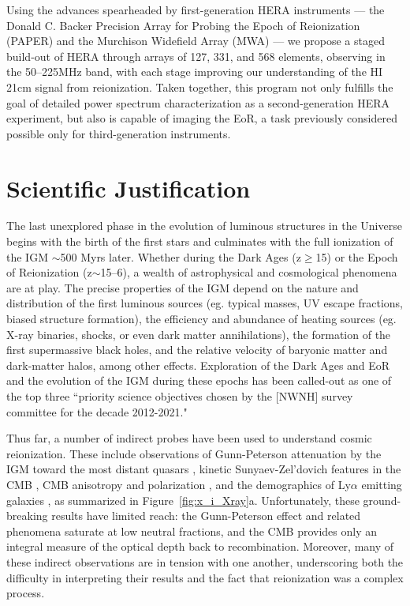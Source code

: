 \documentclass[preprint]{aastex}
\begin{document}
Using the advances spearheaded by 
first-generation HERA instruments --- the Donald C. Backer Precision
Array for Probing the Epoch of Reionization (PAPER) and the Murchison Widefield Array (MWA) ---
we propose a staged
build-out of HERA
through arrays of 127, 331, and 568 elements, 
observing in the 50--225MHz band, 
with each stage improving our 
understanding of the HI 21cm signal from reionization.
Taken together, this program 
not only fulfills the goal of detailed power spectrum
characterization as a second-generation HERA experiment, but also is
capable of imaging the EoR, a task previously considered possible only for
third-generation instruments.


\vspace{-0.25in}
\section{Scientific Justification}
\label{SJsec}

The last unexplored phase in the evolution of luminous structures in the
Universe begins with the birth of the first stars and culminates with the full
ionization of the IGM $\sim$500 Myrs later.  Whether during the Dark Ages
(z$\ge$15) or the Epoch of Reionization (z$\sim$15--6), a wealth of
astrophysical and cosmological phenomena are at play.  The precise properties
of the IGM depend on the nature and distribution of the first luminous sources
(eg. typical masses, UV escape fractions, biased structure formation), the
efficiency and abundance of heating sources (eg.  X-ray binaries, shocks, or
even dark matter annihilations), the formation of the first supermassive black
holes, and the relative velocity of baryonic matter and dark-matter halos,
among other effects.  Exploration of the Dark Ages and EoR and the evolution of
the IGM during these epochs has been called-out as one of the top three
``priority science objectives chosen by the [NWNH] survey committee for the
decade 2012-2021."

Thus far, a number of indirect probes have been used to understand cosmic
reionization.  These include observations of Gunn-Peterson attenuation by the
IGM toward the most distant quasars \citep{fan_et_al2006,bouwens_et_al2010},
kinetic Sunyaev-Zel'dovich features in the CMB \citep{zahn_et_al2012}, CMB
anisotropy and polarization \citep{page_et_al2007,planck_et_al2013}, and the
demographics of Ly$\alpha$ emitting galaxies
\citep{treu_et_al2013}, as summarized in Figure~\ref{fig:x_i_Xray}a.  Unfortunately,
these ground-breaking results have limited reach: the
Gunn-Peterson effect and related phenomena saturate at low neutral fractions,
and the CMB provides only an integral measure of the optical depth
back to recombination.  Moreover, many of these indirect observations are in
tension with one another, underscoring both the difficulty in interpreting
their results and the fact that reionization was a complex process.
\end{document}
